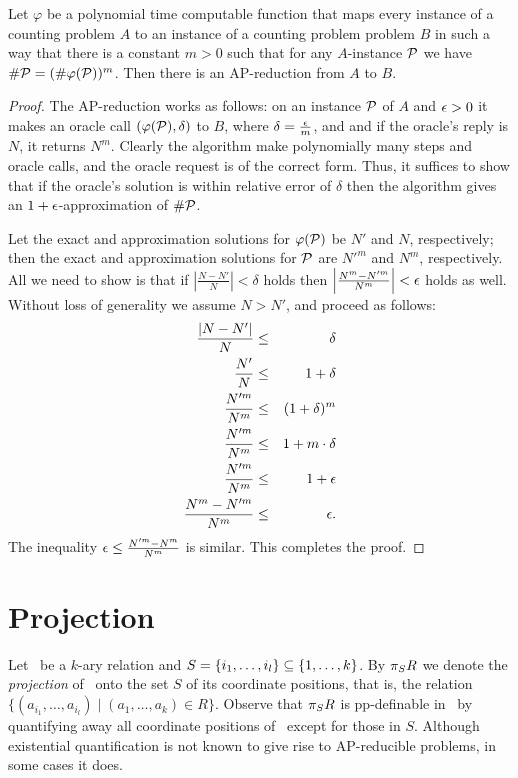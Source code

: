 \begin{lemma} \label{lem:logarithm}
Let \(\varphi\) be a polynomial time computable function that maps every instance of a
counting problem \(A\) to an instance of a counting problem problem \(B\) in such a way that
there is a constant \(m>0\) such that
for any \(A\)-instance \(\mathcal{P}\) we have
\(\#\mathcal{P} = (\#\varphi(\mathcal{P}))^m\)\@.
Then there is an AP-reduction from \(A\) to \(B\)\@.
\end{lemma}

\begin{proof}
The AP-reduction works as follows: on an instance \(\mathcal{P}\) of \(A\) and \(\epsilon > 0\) it makes 
an oracle call \((\varphi(\mathcal{P}),\delta)\) to \(B\), where \(\delta = \frac{\epsilon}{m}\), and 
and if the oracle's reply is \(N\), it returns \(N^m\)\@. Clearly the algorithm make polynomially 
many steps and oracle calls, and the oracle request is of the correct form.
Thus, it suffices to show that if the oracle's solution is within relative error of \(\delta\) then
the algorithm gives an \(1+\epsilon\)-approximation of \(\#\mathcal{P}\)\@.

Let the exact and approximation solutions for \(\varphi(\mathcal{P})\) be \(N'\) and \(N\), respectively;
then the exact and approximation solutions for \(\mathcal{P}\) are  
\(N'^m\) and \(N^m\), respectively.
All we need to show is that if \(\left|\frac{N-N'}{N}\right|<\delta\) holds then
\(\left|\frac{N^m-N'^m}{N^m}\right|<\epsilon\) holds as well. Without loss of generality we assume
\(N>N'\), and proceed as follows:
\begin{eqnarray*}
\frac{|N-N'|}{N} & \le & \delta \\
\frac{N'}{N} & \le & 1 + \delta \\
\frac{N'^m}{N^m} & \le & (1 + \delta) ^ m\\
\frac{N'^m}{N^m} & \le & 1 + m\cdot\delta \\
\frac{N'^m}{N^m} & \le & 1 + \epsilon \\
\frac{N^m - N'^m}{N^m} & \le & \epsilon.
\end{eqnarray*}
The inequality \(\epsilon \le \frac{N'^m - N^m}{N^m}\) is similar.
This completes the proof.
\end{proof}

\section{Projection}
Let \mR\ be a \(k\)-ary relation and \(S=\{{i_1,\dotsc,i_l}\} \subseteq \{{1,\dotsc,k}\}\)\@.
By \(\pi_{S}{R}\) we denote the \emph{projection} of \mR\ onto the set \(S\) of its coordinate
positions, that is, the relation \(\{(a_{i_1},\dotsc,a_{i_l}) \mid (a_1,\dotsc,a_k)\in R\}\)\@.
Observe that \(\pi_{S}{R}\) is pp-definable in \mR\ by quantifying away all coordinate
positions of \mR\ except for those in \(S\)\@.
Although existential quantification is not known to give rise to AP-reducible problems, in some
cases it does.

